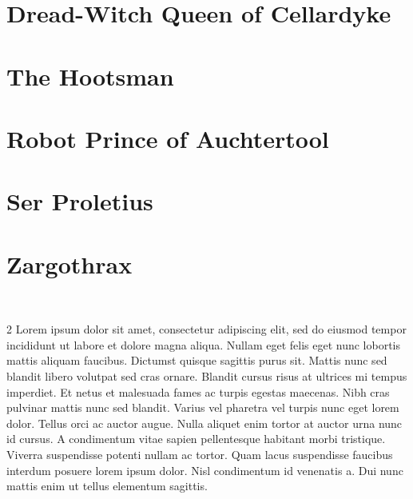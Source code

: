 \section*{Dread-Witch Queen of Cellardyke}\label{char:Dread-WitchQueenOfCellardyk}%
%
\clearpage
\section*{The Hootsman}\label{char:Hootsman}%
%
\clearpage
\section*{Robot Prince of Auchtertool}\label{char:RobotPrinceOfAuchtertool}%
%
\clearpage
\section*{Ser Proletius}\label{char:SerProletius}%
%
\clearpage
\section*{Zargothrax}\label{char:Zargothrax}%
\vspace*{-2.4\fontdimen6\font}\hfill\\\begin{multicols}{2}%
	{\noindent\entryfont Lorem ipsum dolor sit amet, consectetur adipiscing elit, sed do eiusmod tempor incididunt ut labore et dolore magna aliqua. Nullam eget felis eget nunc lobortis mattis aliquam faucibus. Dictumst quisque sagittis purus sit. Mattis nunc sed blandit libero volutpat sed cras ornare. Blandit cursus risus at ultrices mi tempus imperdiet. Et netus et malesuada fames ac turpis egestas maecenas. Nibh cras pulvinar mattis nunc sed blandit. Varius vel pharetra vel turpis nunc eget lorem dolor. Tellus orci ac auctor augue. Nulla aliquet enim tortor at auctor urna nunc id cursus. A condimentum vitae sapien pellentesque habitant morbi tristique. Viverra suspendisse potenti nullam ac tortor. Quam lacus suspendisse faucibus interdum posuere lorem ipsum dolor. Nisl condimentum id venenatis a. Dui nunc mattis enim ut tellus elementum sagittis.}
\end{multicols}%
%
\twocolumn
\clearpage

